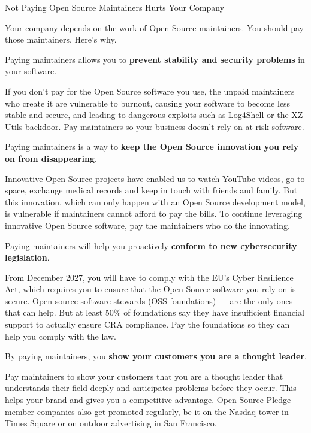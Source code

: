 



\begin{multicols}{2}



{\renewcommand{\baselinestretch}{0.9}\Huge\raggedright Not Paying Open Source Maintainers Hurts Your Company\par}

Your company depends on the work of Open Source maintainers. You should pay those maintainers. Here's why.

 Paying maintainers allows you to \textbf{prevent stability and security problems} in your software.

If you don't pay for the Open Source software you use, the unpaid maintainers who create it are vulnerable to burnout,
causing your software to become less stable and secure, and leading to dangerous exploits such as Log4Shell or the XZ Utils
backdoor. Pay maintainers so your business doesn't rely on at-risk software.

 Paying maintainers is a way to \textbf{keep the Open Source innovation you rely on from
disappearing}.

Innovative Open Source projects have enabled us to watch YouTube videos, go to space, exchange medical records and keep
in touch with friends and family. But this innovation, which can only happen with an Open Source development model, is
vulnerable if maintainers cannot afford to pay the bills. To continue leveraging innovative Open Source software, pay
the maintainers who do the innovating.

 Paying maintainers will help you proactively \textbf{conform to new cybersecurity legislation}.

From December 2027, you will have to comply with the EU's Cyber Resilience Act, which requires you to ensure that the
Open Source software you rely on is secure. Open source software stewards (OSS foundations) — are the only ones that
can help. But at least 50\% of foundations say they have insufficient financial support to actually ensure CRA
compliance. Pay the foundations so they can help you comply with the law.

 By paying maintainers, you \textbf{show your customers you are a thought leader}.

Pay maintainers to show your customers that you are a thought leader that understands their field deeply and anticipates
problems before they occur. This helps your brand and gives you a competitive advantage. Open Source Pledge member
companies also get promoted regularly, be it on the Nasdaq tower in Times Square or on outdoor advertising in San
Francisco.


\end{multicols}
